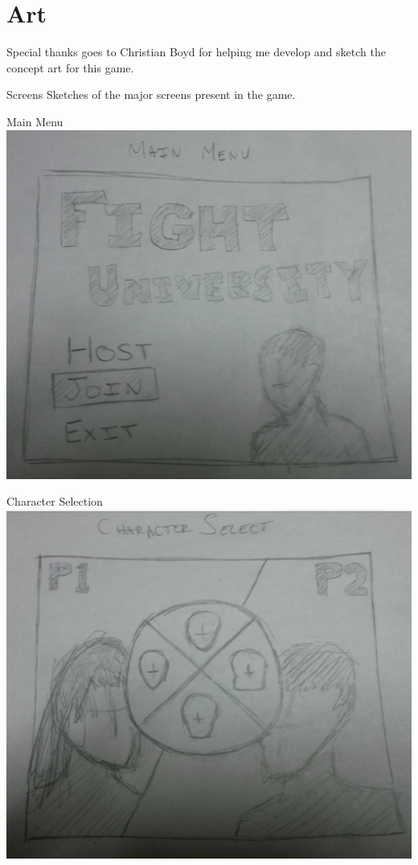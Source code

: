 \documentclass[12pt]{report}
\begin{document}
\chapter{Art}

Special thanks goes to Christian Boyd for helping me develop and sketch the
concept art for this game.

\begin{section}{Screens}
Sketches of the major screens present in the game.

\begin{subsection}{Main Menu}
\includegraphics[width=\textwidth]{mainmenu.png}
\end{subsection}

\begin{subsection}{Character Selection}
\includegraphics[width=\textwidth]{charselect.png}
\end{subsection}


\end{section}
\end{document}
